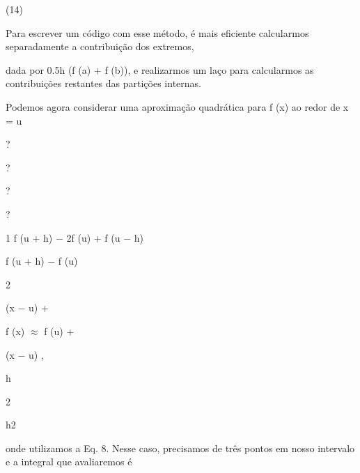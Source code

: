 \documentclass[a4paper,portrait,12pt]{article}
\begin{document}
(14)





\begin{flushleft}
Para escrever um c\'{o}digo com esse m\'{e}todo, \'{e} mais eficiente calcularmos separadamente a contribui\c{c}\~{a}o dos extremos,
\end{flushleft}


\begin{flushleft}
dada por 0.5h (f (a) + f (b)), e realizarmos um la\c{c}o para calcularmos as contribui\c{c}\~{o}es restantes das parti\c{c}\~{o}es internas.
\end{flushleft}


\begin{flushleft}
Podemos agora considerar uma aproxima\c{c}\~{a}o quadr\'{a}tica para f (x) ao redor de x = u
\end{flushleft}


?


?


?


?


\begin{flushleft}
1 f (u + h) $-$ 2f (u) + f (u $-$ h)
\end{flushleft}


\begin{flushleft}
f (u + h) $-$ f (u)
\end{flushleft}


2


\begin{flushleft}
(x $-$ u) +
\end{flushleft}


\begin{flushleft}
f (x) $\approx$ f (u) +
\end{flushleft}


\begin{flushleft}
(x $-$ u) ,
\end{flushleft}


\begin{flushleft}
h
\end{flushleft}


2


\begin{flushleft}
h2
\end{flushleft}


\begin{flushleft}
onde utilizamos a Eq. 8. Nesse caso, precisamos de tr\^{e}s pontos em nosso intervalo e a integral que avaliaremos \'{e}
\end{flushleft}
\end{document}
